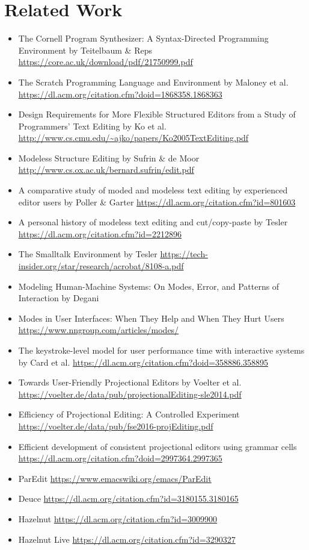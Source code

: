 \documentclass[runningheads]{llncs}
\begin{document}
\section{Related Work}
\begin{itemize}
\item The Cornell Program Synthesizer: A Syntax-Directed Programming Environment by Teitelbaum \& Reps \url{https://core.ac.uk/download/pdf/21750999.pdf}
\item The Scratch Programming Language and Environment by Maloney et al. \url{https://dl.acm.org/citation.cfm?doid=1868358.1868363}
\item Design Requirements for More Flexible Structured Editors from a Study of Programmers' Text Editing by Ko et al. \url{http://www.cs.cmu.edu/~ajko/papers/Ko2005TextEditing.pdf}
\item Modeless Structure Editing by Sufrin \& de Moor \url{http://www.cs.ox.ac.uk/bernard.sufrin/edit.pdf}
\item A comparative study of moded and modeless text editing by experienced editor users by Poller \& Garter \url{https://dl.acm.org/citation.cfm?id=801603}
\item A personal history of modeless text editing and cut/copy-paste by Tesler \url{https://dl.acm.org/citation.cfm?id=2212896}
\item The Smalltalk Environment by Tesler \url{https://tech-insider.org/star/research/acrobat/8108-a.pdf}
\item Modeling Human-Machine Systems: On Modes, Error, and Patterns of Interaction by Degani %
\item Modes in User Interfaces: When They Help and When They Hurt Users \url{https://www.nngroup.com/articles/modes/}
\item The keystroke-level model for user performance time with interactive systems by Card et al. \url{https://dl.acm.org/citation.cfm?doid=358886.358895}
\item Towards User-Friendly Projectional Editors by Voelter et al. \url{https://voelter.de/data/pub/projectionalEditing-sle2014.pdf}
\item Efficiency of Projectional Editing: A Controlled Experiment \url{https://voelter.de/data/pub/fse2016-projEditing.pdf}
\item Efficient development of consistent projectional editors using grammar cells \url{https://dl.acm.org/citation.cfm?doid=2997364.2997365}
\item ParEdit \url{https://www.emacswiki.org/emacs/ParEdit}

\item Deuce \url{https://dl.acm.org/citation.cfm?id=3180155.3180165}
\item Hazelnut \url{https://dl.acm.org/citation.cfm?id=3009900}
\item Hazelnut Live \url{https://dl.acm.org/citation.cfm?id=3290327}
\end{itemize}
\end{document}

